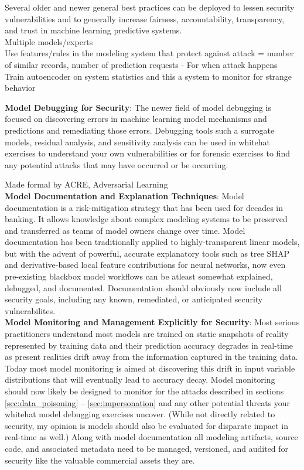 \documentclass[fleqn]{article}
\begin{document}
Several older and newer general best practices can be deployed to lessen security vulnerabilities and to generally increase fairness, accountability, transparency, and trust in machine learning predictive systems.\\ 

Multiple models/experts\\

Use features/rules in the modeling system that protect against attack = number of similar records, number of prediction requests - For when attack happens\\

Train autoencoder on system statistics and this a system to monitor for strange behavior

\noindent\textbf{Model Debugging for Security}: The newer field of model debugging is focused on discovering errors in machine learning model mechanisms and predictions and remediating those errors. Debugging tools such a surrogate models, residual analysis, and sensitivity analysis can be used in whitehat exercises to understand your own vulnerabilities or for forensic exercises to find any potential attacks that may have occurred or be occurring.

Made formal by ACRE, Adversarial Learning \\

\noindent\textbf{Model Documentation and Explanation Techniques}: Model documentation is a risk-mitigation strategy that has been used for decades in banking. It allows knowledge about complex modeling systems to be preserved and transferred as teams of model owners change over time. Model documentation has been traditionally applied to highly-transparent linear models, but with the advent of powerful, accurate explanatory tools such as tree SHAP and derivative-based local feature contributions for neural networks, now even pre-existing blackbox model workflows can be atleast somewhat explained, debugged, and documented. Documentation should obviously now include all security goals, including any known, remediated, or anticipated security vulnerabilites.\\

\noindent\textbf{Model Monitoring and Management Explicitly for Security}: Most serious practitioners understand most models are trained on static snapshots of reality represented by training data and their prediction accuracy degrades in real-time as present realities drift away from the information captured in the training data. Today most model monitoring is aimed at discovering this drift in input variable distributions that will eventually lead to accuracy decay. Model monitoring should now likely be designed to monitor for the attacks described in sections  \ref{sec:data_poisoning} -- \ref{sec:impersonation} and any other potential threats your whitehat model debugging exercises uncover. (While not directly related to security, my opinion is models should also be evaluated for disparate impact in real-time as well.) Along with model documentation all modeling artifacts, source code, and associated metadata need to be managed, versioned, and audited for security like the valuable commercial assets they are.\\
\end{document}
